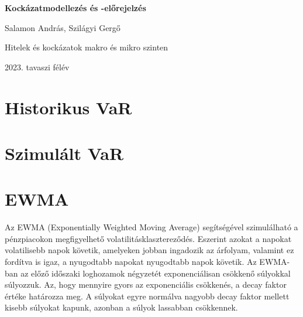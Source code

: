 \documentclass[12pt]{article}
\begin{document}
\begin{titlepage}
	\begin{center}
		\vspace*{5cm}
		
		\Huge
		\textbf{Kockázatmodellezés és -előrejelzés}
		
		\vspace{2cm}
		
		\LARGE
		Salamon András, Szilágyi Gergő
		
		\vfill
		
		\Large
		Hitelek és kockázatok makro és mikro szinten \\

        \vspace{1cm}
        
        2023. tavaszi félév
            
    \end{center}
\end{titlepage}


\tableofcontents

\clearpage

\listoffigures

\clearpage

\section{Historikus VaR}



\section{Szimulált VaR}



\section{EWMA}

Az EWMA (Exponentially Weighted Moving Average) segítségével szimulálható a pénzpiacokon megfigyelhető volatilitásklasztereződés. Eszerint azokat a napokat volatilisebb napok követik, amelyeken jobban ingadozik az árfolyam, valamint ez fordítva is igaz, a nyugodtabb napokat nyugodtabb napok követik. Az EWMA-ban az előző időszaki loghozamok négyzetét exponenciálisan csökkenő súlyokkal súlyozzuk. Az, hogy mennyire gyors az exponenciális csökkenés, a decay faktor értéke határozza meg. A súlyokat egyre normálva nagyobb decay faktor mellett kisebb súlyokat kapunk, azonban a súlyok lassabban csökkennek.
\end{document}
